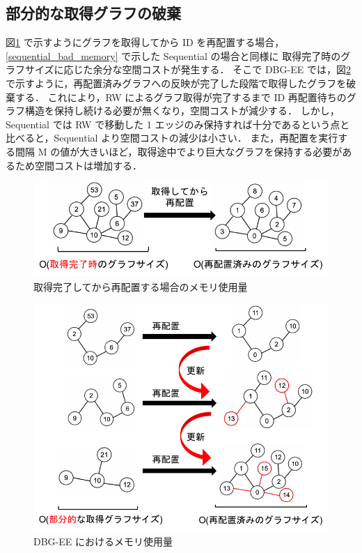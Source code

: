 \subsection{部分的な取得グラフの破棄}
図\ref{dbg-ee_bad_memory} で示すようにグラフを取得してから ID を再配置する場合，\ref{sequential_bad_memory} で示した Sequential の場合と同様に
取得完了時のグラフサイズに応じた余分な空間コストが発生する．
そこで DBG-EE では，図\ref{dbg-ee_good_memory} で示すように，再配置済みグラフへの反映が完了した段階で取得したグラフを破棄する．
これにより，RW によるグラフ取得が完了するまで ID 再配置待ちのグラフ構造を保持し続ける必要が無くなり，空間コストが減少する．
しかし，Sequential では RW で移動した 1 エッジのみ保持すれば十分であるという点と比べると，Sequential より空間コストの減少は小さい．
また，再配置を実行する間隔 M の値が大きいほど，取得途中でより巨大なグラフを保持する必要があるため空間コストは増加する．
\begin{figure}[t]
  \centering
  \includegraphics[width=\linewidth]{./figure/dbg-ee_bad_memory.pdf}
  \caption{取得完了してから再配置する場合のメモリ使用量}
  \label{dbg-ee_bad_memory}
\end{figure}
\begin{figure}[t]
  \centering
  \includegraphics[width=\linewidth]{./figure/dbg-ee_good_memory.pdf}
  \caption{DBG-EE におけるメモリ使用量}
  \label{dbg-ee_good_memory}
\end{figure}

